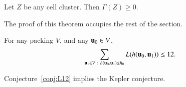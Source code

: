 \begin{theorem}\label{lemma:cluster} 
Let $Z$ be any cell cluster.  Then $\Gamma(Z)\ge 0$.
\end{theorem}

The proof of this theorem occupies the rest of the section.  


\begin{conjecture}\label{conj:L12} For any packing $ V$, and
any $ {\mathbf u}_0\in V$, 
\begin{equation}\label{eqn:L12}
\sum_{ {\mathbf u}_1\in V\ :\  h( {\mathbf u}_0, {\mathbf u}_1)\le {h_0}} L(h( {\mathbf u}_0, {\mathbf u}_1)) \le 12.
\end{equation}
\end{conjecture}

\begin{theorem}\label{theorem:mk2}
Conjecture~\ref{conj:L12} implies the Kepler conjecture.
\end{theorem}

